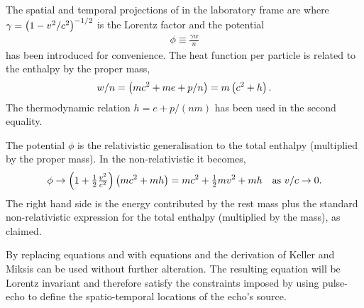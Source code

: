 %
The spatial and temporal projections of  in the laboratory frame are
where  $\gamma = \left( 1-v^2/c^2 \right)^{-1/2}$ is the Lorentz factor and  the potential 
\begin{align}
  \phi \equiv \frac{\gamma w}{n} \label{eqn:phiDefn}
\end{align}
has been introduced for convenience.
The heat function per particle is related to the enthalpy by the proper mass,
\begin{align}
  w/n = \left( mc^2 + me + p/n \right) = m\left( c^2 +  h \right).
\end{align}
The thermodynamic relation $h = e + p/(nm)$ has been used in the second equality.

The potential $\phi$ is the relativistic generalisation to the total enthalpy (multiplied by the proper mass).
In the non-relativistic it becomes, 
\begin{align}
  \phi \rightarrow \left( 1+\tfrac{1}{2}\tfrac{v^2}{c^2} \right) \left( mc^2 + mh \right) = mc^2 + \tfrac{1}{2}m v^2 + mh \text{\quad as ${v/c\rightarrow 0.}$}
\end{align}
The right hand side is the energy contributed by the rest mass plus the  standard non-relativistic expression for the  total enthalpy (multiplied by the mass),
as claimed.

By replacing equations  and  with equations  and  the derivation of Keller and Miksis
can be used without further alteration.
The resulting equation will be Lorentz invariant and therefore satisfy the constraints imposed by using pulse-echo to  define the spatio-temporal locations of the echo's source.



